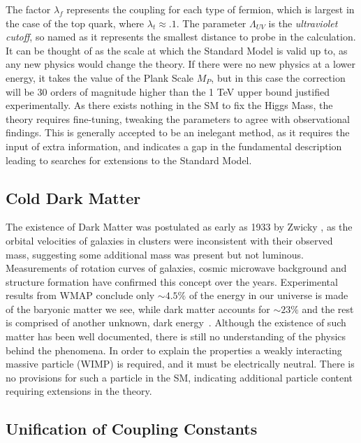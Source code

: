The factor $\lambda_{f}$  represents the coupling for each type of fermion, which is largest in the case of the top quark, where $\lambda_{t} \approx. 1$. The parameter $\Lambda_{UV}$ is the \textit{ultraviolet cutoff}, so named as it represents the smallest distance to probe in the calculation. It can be thought of as the scale at which the Standard Model is valid up to, as any new physics would change the theory. If there were no new physics at a lower energy, it takes the value of the Plank Scale $M_{P}$, but in this case the correction will be 30 orders of magnitude higher than the 1 TeV upper bound justified experimentally\cite{Drees}. As there exists nothing in the SM to fix the Higgs Mass, the theory requires fine-tuning, tweaking the parameters to agree with observational findings. This is generally accepted to be an inelegant method, as it requires the input of extra information, and indicates a gap in the fundamental description leading to searches for extensions to the Standard Model. 

\subsection{Cold Dark Matter}

The existence of Dark Matter was postulated as early as 1933 by Zwicky \cite{zwicky}, as the orbital velocities of galaxies in clusters were inconsistent with their observed mass, suggesting some additional mass was present but not luminous.  Measurements of rotation curves of galaxies, cosmic microwave background and structure formation have confirmed this concept over the years. Experimental results from WMAP conclude only $\sim 4.5\%$ of the energy in our universe is made of the baryonic matter we see, while dark matter accounts for $\sim 23\%$ and the rest is comprised of another unknown, dark energy~\cite{WMAP5}. Although the existence of such matter has been well documented, there is still no understanding of the physics behind the phenomena. In order to explain the properties a weakly interacting massive particle (WIMP) is required, and it must be electrically neutral. There is no provisions for such a particle in the SM, indicating additional particle content requiring extensions in the theory. 

\subsection{Unification of Coupling Constants}

